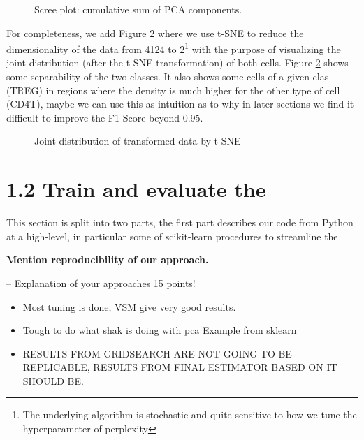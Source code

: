 \documentclass{article}
\begin{document}
\begin{figure}[h]
    
    
    \caption{Scree plot: cumulative sum of PCA components.}\label{fig:scree}
\end{figure}

For completeness, we add Figure \ref{fig:tsne} where we use t-SNE to reduce the dimensionality of the data from 4124 to 2\footnote{ The underlying algorithm is stochastic 
and quite sensitive to how we tune the hyperparameter of perplexity} with the purpose of visualizing the joint distribution (after the t-SNE transformation) of both cells. 
Figure \ref{fig:tsne} shows some separability of the two classes. It also shows some cells of a given clas (TREG) in regions where the density is much higher for the other type of cell (CD4T), maybe we can use this as intuition as to why
in later sections we find it difficult to improve the F1-Score beyond 0.95.


\begin{figure}[h]
    
    
    \caption{Joint distribution of transformed data by t-SNE}\label{fig:tsne}
\end{figure}

\section{1.2 Train and evaluate the }
This section is split into two parts, the first part describes our code from Python at a high-level, in particular some of scikit-learn procedures to
streamline the 

\textbf{Mention reproducibility of our approach.}


– Explanation of your approaches 15 points!
\begin{itemize}
    \item Most tuning is done, VSM give very good results.
    \item Tough to do what shak is doing with pca \href{https://scikit-learn.org/1.5/auto_examples/compose/plot_digits_pipe.html}{Example from sklearn}

    \item RESULTS FROM GRIDSEARCH ARE NOT GOING TO BE REPLICABLE, RESULTS FROM FINAL ESTIMATOR BASED ON IT SHOULD BE.
\end{itemize}
\end{document}
